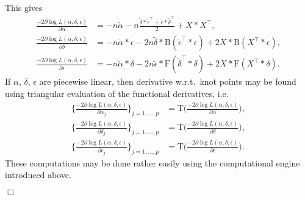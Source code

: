 \documentclass[12pt,a4paper]{article}
\begin{document}
This gives
\begin{align*}
\frac{-2 \partial \log L(\alpha,\delta,\epsilon)}{\partial \alpha} &= -n \tilde{\alpha} - n \frac{\tilde{\delta} * \tilde{\epsilon}^\top + \tilde{\epsilon} * \tilde{\delta}^\top}{2} + X * X^\top, \\
\frac{-2 \partial \log L(\alpha,\delta,\epsilon)}{\partial \delta} &= -n \tilde{\alpha} * \epsilon - 2 n \tilde{\delta} * \mathrm{B}(\tilde{\epsilon}^\top * \epsilon) + 2 X * \mathrm{B}(X^\top * \epsilon), \\
\frac{-2 \partial \log L(\alpha,\delta,\epsilon)}{\partial \epsilon} &= -n \tilde{\alpha} * \delta - 2 n \tilde{\epsilon} * \mathrm{F}(\tilde{\delta}^\top * \delta) + 2 X * \mathrm{F}(X^\top * \delta).
\end{align*}
If $\alpha$, $\delta$, $\epsilon$ are piecewise linear, then derivative w.r.t.\ knot points may be found using triangular evaluation of the functional derivatives, i.e.
\begin{align*}
\bigg\{ \frac{-2 \partial \log L(\alpha,\delta,\epsilon)}{\partial \alpha_j} \bigg\}_{j=1,\dotsc,p} &= \mathrm{T}\bigg( \frac{-2 \partial \log L(\alpha,\delta,\epsilon)}{\partial \alpha} \bigg), \\
\bigg\{ \frac{-2 \partial \log L(\alpha,\delta,\epsilon)}{\partial \delta_j} \bigg\}_{j=1,\dotsc,p} &= \mathrm{T}\bigg( \frac{-2 \partial \log L(\alpha,\delta,\epsilon)}{\partial \delta} \bigg), \\
\bigg\{ \frac{-2 \partial \log L(\alpha,\delta,\epsilon)}{\partial \epsilon_j} \bigg\}_{j=1,\dotsc,p} &= \mathrm{T}\bigg( \frac{-2 \partial \log L(\alpha,\delta,\epsilon)}{\partial \epsilon} \bigg).
\end{align*}
These computations may be done rather easily using the computational engine introduced above.

\hfill{$\Box$}
\end{document}
